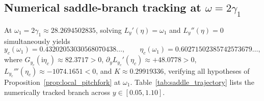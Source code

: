 \documentclass[11pt,a4paper,reqno]{amsart}
\theoremstyle{definition}
\theoremstyle{remark}
\numberwithin{equation}{section}
\newcommand{\ii}{\mathrm{i}}
\begin{document}
\subsection{Numerical saddle-branch tracking at $\omega = 2\gamma_1$}

At $\omega_1 = 2\gamma_1 \approx 28.2694502835$, solving $L_y'(\eta) = \omega_1$ and $L_y''(\eta) = 0$ simultaneously yields
\[
y_c(\omega_1) = 0.43202053030568070438\dots, \qquad \eta_c(\omega_1) = 0.60271502385742573679\dots,
\]
where $G_{y_c}(\ii\eta_c) \approx 82.3717 > 0$, $\partial_y L_{y_c}'(\eta_c) \approx +48.0778 > 0$, $L_{y_c}'''(\eta_c) \approx -1074.1651 < 0$, and $K \approx 0.29919336$, verifying all hypotheses of Proposition~\ref{prop:local_pitchfork} at $\omega_1$. Table~\ref{tab:saddle_trajectory} lists the numerically tracked branch across $y \in [0.05, 1.10]$.
\end{document}
